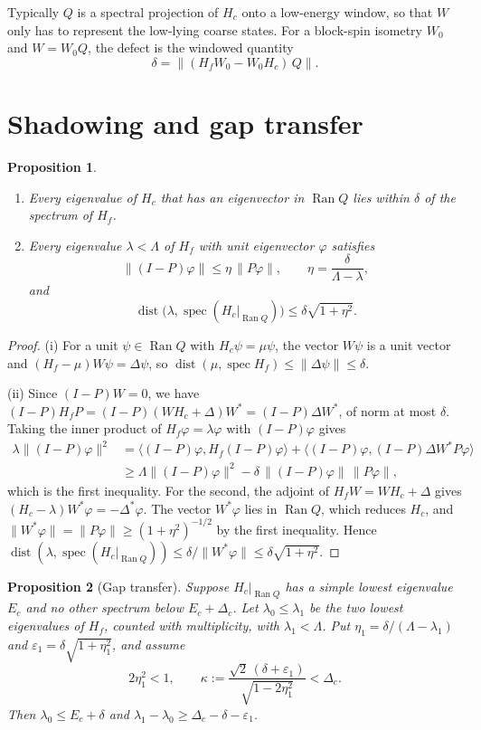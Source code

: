 \documentclass[11pt]{article}
\newtheorem{proposition}{Proposition}
\theoremstyle{remark}
\newcommand{\Ran}{\operatorname{Ran}}
\newcommand{\spec}{\operatorname{spec}}
\newcommand{\dist}{\operatorname{dist}}
\begin{document}
Typically $Q$ is a spectral projection of $H_c$ onto a low-energy window, so that $W$ only has to represent the low-lying coarse states. For a block-spin isometry $W_0$ and $W=W_0Q$, the defect is the windowed quantity
\[
 \delta=\|(H_fW_0-W_0H_c)\,Q\| .
\]

\section{Shadowing and gap transfer}

\begin{proposition}\label{prop:shadow}
\begin{enumerate}
\item[(i)] Every eigenvalue of $H_c$ that has an eigenvector in $\Ran Q$ lies within $\delta$ of the spectrum of $H_f$.
\item[(ii)] Every eigenvalue $\lambda<\Lambda$ of $H_f$ with unit eigenvector $\varphi$ satisfies
\[
 \|(I-P)\varphi\|\le\eta\,\|P\varphi\|,\qquad \eta=\frac{\delta}{\Lambda-\lambda},
\]
and
\[
 \dist\bigl(\lambda,\spec(H_c|_{\Ran Q})\bigr)\le\delta\sqrt{1+\eta^2}.
\]
\end{enumerate}
\end{proposition}

\begin{proof}
(i) For a unit $\psi\in\Ran Q$ with $H_c\psi=\mu\psi$, the vector $W\psi$ is a unit vector and $(H_f-\mu)W\psi=\Delta\psi$, so $\dist(\mu,\spec H_f)\le\|\Delta\psi\|\le\delta$.

(ii) Since $(I-P)W=0$, we have $(I-P)H_fP=(I-P)(WH_c+\Delta)W^*=(I-P)\Delta W^*$, of norm at most $\delta$. Taking the inner product of $H_f\varphi=\lambda\varphi$ with $(I-P)\varphi$ gives
\[
 \begin{aligned}
 \lambda\|(I-P)\varphi\|^2&=\langle(I-P)\varphi,H_f(I-P)\varphi\rangle+\langle(I-P)\varphi,(I-P)\Delta W^*P\varphi\rangle\\
 &\ge\Lambda\|(I-P)\varphi\|^2-\delta\,\|(I-P)\varphi\|\,\|P\varphi\| ,
 \end{aligned}
\]
which is the first inequality. For the second, the adjoint of $H_fW=WH_c+\Delta$ gives $(H_c-\lambda)W^*\varphi=-\Delta^*\varphi$. The vector $W^*\varphi$ lies in $\Ran Q$, which reduces $H_c$, and $\|W^*\varphi\|=\|P\varphi\|\ge(1+\eta^2)^{-1/2}$ by the first inequality. Hence $\dist(\lambda,\spec(H_c|_{\Ran Q}))\le\delta/\|W^*\varphi\|\le\delta\sqrt{1+\eta^2}$.
\end{proof}

\begin{proposition}[Gap transfer]\label{prop:gap}
Suppose $H_c|_{\Ran Q}$ has a simple lowest eigenvalue $E_c$ and no other spectrum below $E_c+\Delta_c$. Let $\lambda_0\le\lambda_1$ be the two lowest eigenvalues of $H_f$, counted with multiplicity, with $\lambda_1<\Lambda$. Put $\eta_1=\delta/(\Lambda-\lambda_1)$ and $\varepsilon_1=\delta\sqrt{1+\eta_1^2}$, and assume
\[
 2\eta_1^2<1,\qquad \kappa:=\frac{\sqrt2\,(\delta+\varepsilon_1)}{\sqrt{1-2\eta_1^2}}<\Delta_c .
\]
Then $\lambda_0\le E_c+\delta$ and $\lambda_1-\lambda_0\ge\Delta_c-\delta-\varepsilon_1$.
\end{proposition}
\end{document}

